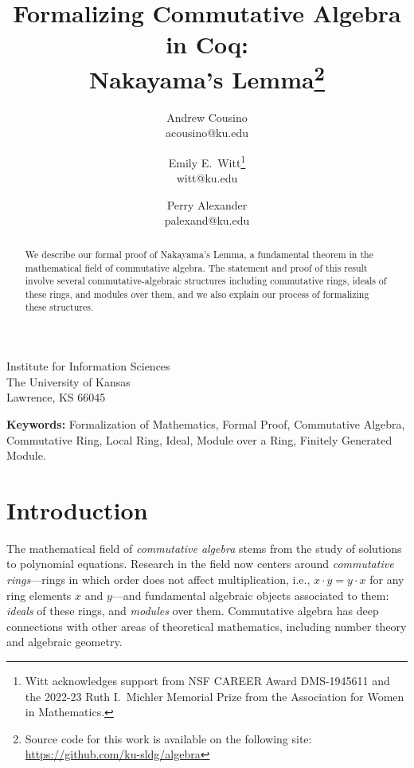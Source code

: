 \documentclass{article}
\begin{document}
\title{ 
Formalizing Commutative Algebra in Coq: \\
Nakayama's Lemma\thanks{Source code for this work is available on the following
site: \url{https://github.com/ku-sldg/algebra}}
}

\date{}

\author{ 
	Andrew Cousino \\ {\ttfamily acousino@ku.edu}
	\and 
	Emily E.\ Witt\thanks{Witt acknowledges support from NSF CAREER Award
    DMS-1945611 and the 2022-23 Ruth I.\, Michler Memorial Prize from the
    Association for Women in Mathematics.} \\ {\ttfamily witt@ku.edu}
  \and 
	Perry Alexander \\ {\ttfamily palexand@ku.edu}
}	

\maketitle	

\vspace{-1cm}

{\large
\begin{center}
	Institute for Information Sciences \\
	The University of Kansas \\
	Lawrence, KS 66045
\end{center}
}


\begin{abstract}
  We describe our formal proof of Nakayama's Lemma, a fundamental theorem in
  the mathematical field of commutative algebra. The statement and proof of
  this result involve several commutative-algebraic structures including
  commutative rings, ideals of these rings, and modules over them, and we also
  explain our process of formalizing these structures.
\end{abstract}

\noindent \textbf{Keywords:}
Formalization of Mathematics,
Formal Proof,
Commutative Algebra,
Commutative Ring,
Local Ring,
Ideal,
Module over a Ring,
Finitely Generated Module. 

\section{Introduction}
The mathematical field of \emph{commutative algebra} stems from the study of
solutions to polynomial equations. Research in the field now centers around
\emph{commutative rings}---rings in which order does not affect multiplication,
i.e., $x \cdot y = y \cdot x$ for any ring elements $x$ and $y$---and
fundamental algebraic objects associated to them:  \emph{ideals} of these
rings, and \emph{modules} over them. Commutative algebra has deep connections
with other areas of theoretical mathematics, including number theory and
algebraic geometry. 
\end{document}
